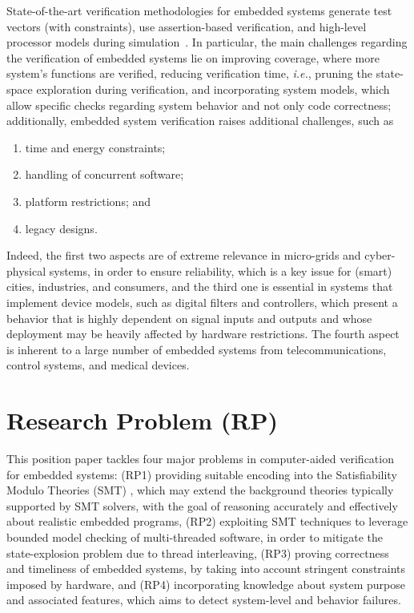 \documentclass{acm_sen_article}
\begin{document}
State-of-the-art verification methodologies for embedded systems generate test vectors (with constraints), use assertion-based verification, and high-level processor models during simulation~\cite{Behrend15,Lettnin09}. In particular, the main challenges regarding the verification of embedded systems lie on improving coverage, where more system's functions are verified, reducing verification time, {\it i.e.}, pruning the state-space exploration during verification, and incorporating system models, which allow specific checks regarding system behavior and not only code correctness; additionally, embedded system verification raises additional challenges, such as 
%
\begin{enumerate}
	\item time and energy constraints;
	\item handling of concurrent software;
	\item platform restrictions; and
	\item legacy designs.%
\end{enumerate}

Indeed, the first two aspects are of extreme relevance in micro-grids and cyber-physical systems, in order to ensure reliability, which is a key issue for (smart) cities, industries, and consumers, and the third one is essential in systems that implement device models, such as digital filters and controllers, which present a behavior that is highly dependent on signal inputs and outputs and whose deployment may be heavily affected by hardware restrictions. The fourth aspect is inherent to a large number of embedded systems from  telecommunications, control systems, and medical devices.


\section{Research Problem (RP)}

This position paper tackles four major problems in computer-aided verification for embedded systems: (RP1) providing suitable encoding into the Satisfiability Modulo Theories (SMT) \cite{BarrettSST09}, which may extend the background theories typically supported by SMT solvers, with the goal of reasoning accurately and effectively about realistic embedded programs, (RP2) exploiting SMT techniques to leverage bounded model checking of multi-threaded software, in order to mitigate the state-explosion problem due to thread interleaving, (RP3) proving correctness and timeliness of embedded systems, by taking into account stringent constraints imposed by hardware, and (RP4) incorporating knowledge about system purpose and associated features, which aims to detect system-level and behavior failures.
\end{document}
